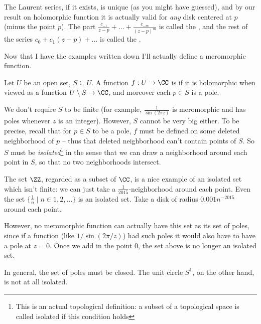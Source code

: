 \begin{definition}
The Laurent series, if it exists, is unique (as you might have guessed),
and by our result on holomorphic function it is actually valid for \emph{any}
disk centered at $p$ (minus the point $p$).
The part $\frac{c_{-1}}{z-p} + \dots + \frac{c_{-m}}{(z-p)^m}$ is called the ,
and the rest of the series $c_0 + c_1(z-p) + \dots$ is called the .

Now that I have the examples written down I'll actually define a meromorphic function.
\begin{definition}
	Let $U$ be an open set, $S \subseteq U$.
	A function $f : U \to \CC$ is 
	if it is holomorphic when viewed as a function $U \setminus S \to \CC$,
	and moreover each $p \in S$ is a pole.
\end{definition}
We don't require $S$ to be finite (for example, $\frac{1}{\sin(2\pi z)}$ is meromorphic
and has poles whenever $z$ is an integer).
However, $S$ cannot be very big either.
To be precise, recall that for $p \in S$ to be a pole, $f$ must be defined on some
deleted neighborhood of $p$ -- thus that deleted neighborhood can't contain points of $S$.
So $S$ must be \emph{isolated}\footnote{This is an actual topological definition: a subset
of a topological space is called isolated if this condition holds}
in the sense that we can draw a neighborhood around
each point in $S$, so that no two neighborhoods intersect.

\begin{example}
	\listhack
	\begin{enumerate}[(a)]
		\ii The set $\ZZ$, regarded as a subset of $\CC$, is a nice example of an isolated set
		which isn't finite: we can just take a $\frac{1}{2015}$-neighborhood around each point.
		\ii Even the set $\{\frac 1n \mid n \in 1,2,\dots \}$ is an isolated set.
		Take a disk of radius $0.001n^{-2015}$ around each point.
		
		However, no meromorphic function can actually have this set as its set of poles, since
		if a function (like $1/\sin(2\pi/z)$) had such poles it would also have to have a pole at $z=0$.
		Once we add in the point $0$, the set above is no longer an isolated set.

		In general, the set of poles must be closed.
		\ii The unit circle $S^1$, on the other hand, is not at all isolated.
	\end{enumerate}
\end{example}



\end{definition}
